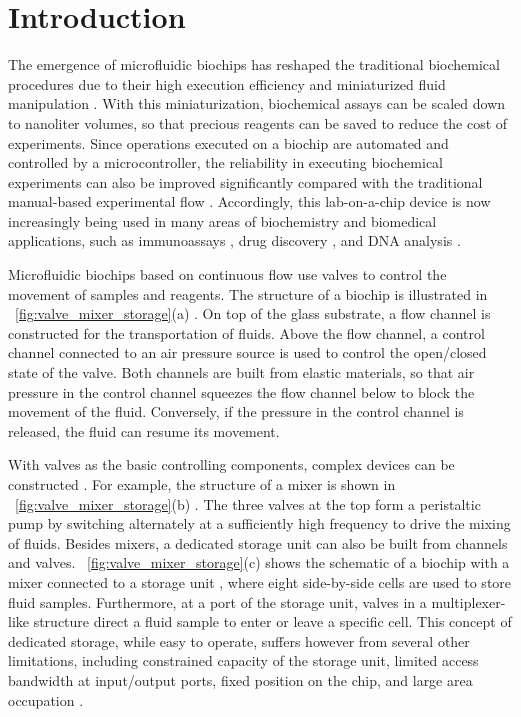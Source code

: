 \section{Introduction}\label{introduction}
The emergence of microfluidic biochips has reshaped the traditional biochemical procedures due to their high execution efficiency and miniaturized fluid manipulation \cite{EVNR03,JMSQ07}.
With this miniaturization, biochemical assays can be scaled down to nanoliter volumes,
so that precious reagents can be saved to reduce the cost of experiments.
Since operations executed on a biochip are automated and controlled
by a microcontroller, the reliability in executing biochemical experiments
can also be improved significantly compared with the traditional
manual-based experimental flow \cite{hu2017computer}. Accordingly, this lab-on-a-chip device is now increasingly being used in many areas of biochemistry and biomedical applications, such as immunoassays \cite{kartalov2006high}, drug discovery \cite{einav2008discovery}, and DNA analysis \cite{hong2006molecular}.


Microfluidic biochips based on continuous flow use valves
to control the movement of samples and reagents.  The structure of a biochip
is illustrated in \figname~\ref{fig:valve_mixer_storage}(a) \cite{zhu2018multi}.
On top of the glass substrate, a flow channel is constructed for the transportation of fluids.
Above the flow channel, a control channel connected to an air pressure source is used to control the open/closed state of the valve. Both channels are built from elastic materials, so that air pressure
in the control channel squeezes the flow channel below to block the movement
of the fluid. Conversely, if the pressure in the control channel is released,
the fluid can resume its movement.

With valves as the basic controlling components, complex devices can
be constructed \cite{squires2005microfluidics}. For example,
the structure of a mixer is shown in \figname~\ref{fig:valve_mixer_storage}(b) \cite{HuDHC17}. The
three valves at the top form a peristaltic pump by switching alternately at a
sufficiently high frequency to drive the mixing of fluids.
Besides mixers, a dedicated storage unit can also be built from channels and
valves. \figname~\ref{fig:valve_mixer_storage}(c) shows the schematic
of a biochip with a mixer connected to a storage unit \cite{AminTA09}, where eight side-by-side cells are used to store fluid samples. Furthermore, at a port of the storage unit, valves in a multiplexer-like structure direct a fluid sample to enter or leave a specific cell. This concept of dedicated storage, while easy to operate, suffers however from several other limitations, including constrained capacity of the storage unit, limited access bandwidth at input/output ports, fixed position on the chip, and large area occupation \cite{Chen2019DCSA}.

